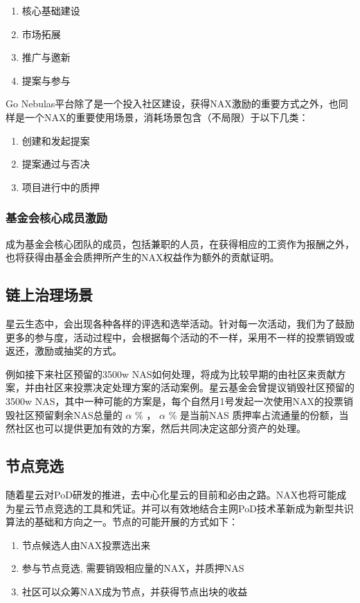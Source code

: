 \begin{enumerate}[\hspace{1cm}(a)]
  \item 核心基础建设
  \item 市场拓展
  \item 推广与邀新
  \item 提案与参与
\end{enumerate}

Go Nebulas平台除了是一个投入社区建设，获得NAX激励的重要方式之外，也同样是一个NAX的重要使用场景，消耗场景包含（不局限）于以下几类：
\begin{enumerate}[\hspace{1cm}(a)]
  \item 创建和发起提案
  \item 提案通过与否决
  \item 项目进行中的质押
\end{enumerate}

\subsubsection{基金会核心成员激励}
成为基金会核心团队的成员，包括兼职的人员，在获得相应的工资作为报酬之外，也将获得由基金会质押所产生的NAX权益作为额外的贡献证明。


\subsection{链上治理场景}
星云生态中，会出现各种各样的评选和选举活动。针对每一次活动，我们为了鼓励更多的参与度，活动过程中，会根据每个活动的不一样，采用不一样的投票销毁或返还，激励或抽奖的方式。

例如接下来社区预留的3500w NAS如何处理，将成为比较早期的由社区来贡献方案，并由社区来投票决定处理方案的活动案例。星云基金会曾提议销毁社区预留的3500w NAS，其中一种可能的方案是，每个自然月1号发起一次使用NAX的投票销毁社区预留剩余NAS总量的 \(\alpha\) \% ， \(\alpha\) \% 是当前NAS 质押率占流通量的份额，当然社区也可以提供更加有效的方案，然后共同决定这部分资产的处理。

\subsection{节点竞选}
随着星云对PoD研发的推进，去中心化星云的目前和必由之路。NAX也将可能成为星云节点竞选的工具和凭证。并可以有效地结合主网PoD技术革新成为新型共识算法的基础和方向之一。节点的可能开展的方式如下：
\begin{enumerate}[\hspace{1cm}(a)]
  \item 节点候选人由NAX投票选出来
  \item 参与节点竞选, 需要销毁相应量的NAX，并质押NAS
  \item 社区可以众筹NAX成为节点，并获得节点出块的收益
\end{enumerate}

